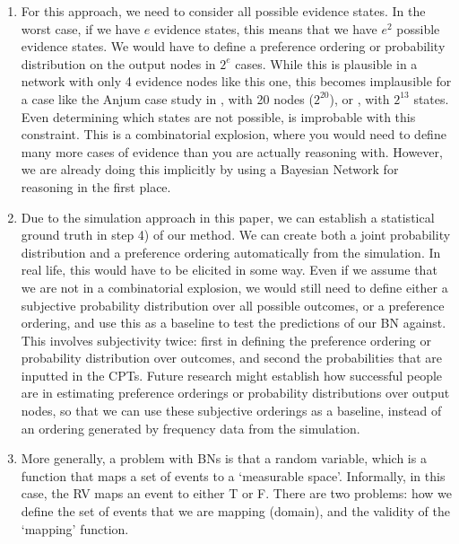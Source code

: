 \documentclass[11pt]{article}
\begin{document}
\begin{enumerate}

\item For this approach, we need to consider all possible evidence states. In the worst case, if we have $e$ evidence states, this means that we have $e^2$ possible evidence states. We would have to define a preference ordering or probability distribution on the output nodes in $2^e$ cases. While this is plausible in a network with only 4 evidence nodes like this one, this becomes implausible for a case like the Anjum case study in \citet{vlek2016}, with 20 nodes ($2^20$), or \citet{Fenton2019}, with $2^13$ states. Even determining which states are not possible, is improbable with this constraint. This is a combinatorial explosion, where you would need to define many more cases of evidence than you are actually reasoning with. However, we are already doing this implicitly by using a Bayesian Network for reasoning in the first place. 

\item Due to the simulation approach in this paper, we can establish a statistical ground truth in step 4) of our method. We can create both a joint probability distribution and a preference ordering automatically from the simulation. In real life, this would have to be elicited in some way. Even if we assume that we are not in a combinatorial explosion, we would still need to define either a subjective probability distribution over all possible outcomes, or a preference ordering, and use this as a baseline to test the predictions of our BN against. This involves subjectivity twice: first in defining the preference ordering or probability distribution over outcomes, and second the probabilities that are inputted in the CPTs. Future research might establish how successful people are in estimating preference orderings or probability distributions over output nodes, so that we can use these subjective orderings as a baseline, instead of an ordering generated by frequency data from the simulation.

\item More generally, a problem with BNs is that a random variable, which is a function that maps a set of events to a `measurable space'. Informally, in this case, the RV maps an event to either T or F. There are two problems: how we define the set of events that we are mapping (domain), and the validity of the `mapping' function.


\end{enumerate}
\end{document}
